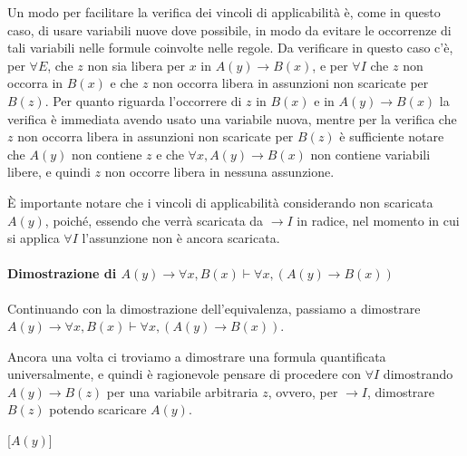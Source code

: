 \begin{prooftree}
\end{prooftree}

Un modo per facilitare la verifica dei vincoli di applicabilità è, come in questo caso, di usare variabili nuove dove possibile, in modo da evitare le occorrenze di tali variabili nelle formule coinvolte nelle regole. Da verificare in questo caso c'è, per \(\forall E\), che \(z\) non sia libera per \(x\) in \(A(y)\to B(x)\), e per \(\forall I\) che \(z\) non occorra in \(B(x)\) e che \(z\) non occorra libera in assunzioni non scaricate per \(B(z)\). Per quanto riguarda l'occorrere di \(z\) in \(B(x)\) e in \(A(y) \to B(x)\) la verifica è immediata avendo usato una variabile nuova, mentre per la verifica che \(z\) non occorra libera in assunzioni non scaricate per \(B(z)\) è sufficiente notare che \(A(y)\) non contiene \(z\) e che \(\forall x, A(y)\to B(x)\) non contiene variabili libere, e quindi \(z\) non occorre libera in nessuna assunzione.

È importante notare che i vincoli di applicabilità considerando non scaricata \(A(y)\), poiché, essendo che verrà scaricata da \(\to I\) in radice, nel momento in cui si applica \(\forall I\) l'assunzione non è ancora scaricata.

\paragraph{Dimostrazione di \(A(y) \to \forall x, B(x) \vdash \forall x, (A(y) \to B(x))\)}

Continuando con la dimostrazione dell'equivalenza, passiamo a dimostrare \(A(y) \to \forall x, B(x) \vdash \forall x, (A(y) \to B(x))\).

Ancora una volta ci troviamo a dimostrare una formula quantificata universalmente, e quindi è ragionevole pensare di procedere con \(\forall I\) dimostrando \(A(y) \to B(z)\) per una variabile arbitraria \(z\), ovvero, per \(\to I\), dimostrare \(B(z)\) potendo scaricare \(A(y)\).

\begin{prooftree}
  [\(A(y)\)]
\end{prooftree}

